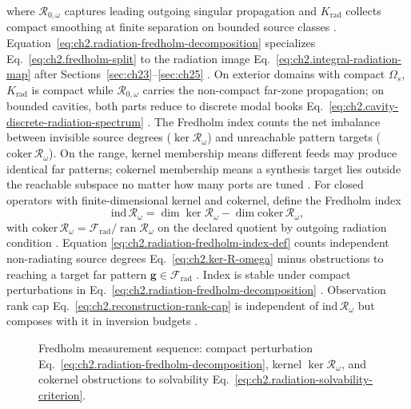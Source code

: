 where \(\mathcal{R}_{0,\omega}\) captures leading outgoing singular propagation and
\(K_{\mathrm{rad}}\) collects compact smoothing at finite separation on bounded source classes
\cite{stratton1941}. Equation~\eqref{eq:ch2.radiation-fredholm-decomposition}
specializes Eq.~\eqref{eq:ch2.fredholm-split} to the radiation image
Eq.~\eqref{eq:ch2.integral-radiation-map} after Sections~\ref{sec:ch23}--\ref{sec:ch25}
\cite{stratton1941}. On exterior domains with compact
\(\Omega_s\), \(K_{\mathrm{rad}}\) is compact while \(\mathcal{R}_{0,\omega}\) carries the
non-compact far-zone propagation; on bounded cavities, both parts reduce to discrete modal
books Eq.~\eqref{eq:ch2.cavity-discrete-radiation-spectrum} \cite{harrington2001}.
The Fredholm index counts the net imbalance between invisible source degrees
($\ker\mathcal{R}_\omega$) and unreachable pattern targets
($\mathrm{coker}\,\mathcal{R}_\omega$). On the range, kernel membership means different
feeds may produce identical far patterns; cokernel membership means a synthesis target lies
outside the reachable subspace no matter how many ports are tuned \cite{stratton1941}.
For closed operators with finite-dimensional kernel and cokernel, define the Fredholm index
\begin{equation}
\label{eq:ch2.radiation-fredholm-index-def}
\mathrm{ind}\,\mathcal{R}_\omega
=
\dim\ker\mathcal{R}_\omega
-
\dim\mathrm{coker}\,\mathcal{R}_\omega,
\end{equation}
with \(\mathrm{coker}\,\mathcal{R}_\omega=\mathcal{F}_{\mathrm{rad}}/\operatorname{ran}\mathcal{R}_\omega\)
on the declared quotient by outgoing radiation condition \cite{stratton1941}. Equation
\eqref{eq:ch2.radiation-fredholm-index-def} counts independent non-radiating source degrees
Eq.~\eqref{eq:ch2.ker-R-omega} minus obstructions to reaching a target far pattern
\(\mathbf{g}\in\mathcal{F}_{\mathrm{rad}}\) \cite{stratton1941}. Index is stable under compact
perturbations in Eq.~\eqref{eq:ch2.radiation-fredholm-decomposition}
\cite{harrington2001}. Observation rank cap Eq.~\eqref{eq:ch2.reconstruction-rank-cap}
is independent of \(\mathrm{ind}\,\mathcal{R}_\omega\) but composes with it in inversion
budgets \cite{stratton1941}.
\begin{figure}[t]
\centering
{}
\caption{Fredholm measurement sequence: compact perturbation
Eq.~\eqref{eq:ch2.radiation-fredholm-decomposition}, kernel
\(\ker\mathcal{R}_\omega\), and cokernel obstructions to solvability
Eq.~\eqref{eq:ch2.radiation-solvability-criterion}.}
\label{fig:ch2.fredholm-radiation-measurement chain}
\end{figure}
